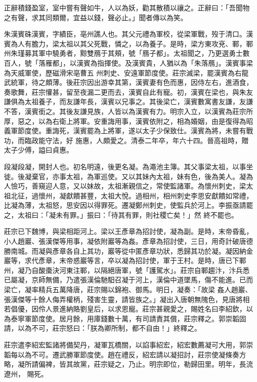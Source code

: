 \begin{pinyinscope}
 正辭積錢盈室，室中嘗有聲如牛，人以為妖，勸其散積以禳之。正辭曰：「吾聞物之有聲，求其同類爾，宜益以錢，聲必止。」聞者傳以為笑。



 朱漢賓硃漢賓，字績臣，亳州譙人也。其父元禮為軍校，從梁軍戰，歿于清口。漢賓為人有膽力，梁太祖以其父死戰，憐之，以為養子。是時，梁方東攻兗、鄆，鄆州朱瑾募其軍中驍勇者，黥雙鴈于其頰，號「鴈子都」。太祖聞之，乃更選勇士數百人，號「落雁都」，以漢賓為指揮使。及漢賓貴，人猶以為「朱落鴈」。漢賓事梁為天威軍使，歷磁滑宋亳曹五
 州刺史、安遠軍節度使。莊宗滅梁，罷漢賓為右龍武統軍，待之頗薄。後莊宗因出游幸其第，漢賓妻有色而惠，因侍左右，進酒食，奏歌舞，莊宗懽甚，留至夜漏二更而去，漢賓自此有寵。初，漢賓在梁也，與朱友謙俱為太祖養子，而友謙年長，漢賓以兄事之。其後梁亡，漢賓數寓書友謙，友謙不答，漢賓銜之。其後友謙見族，人皆以為漢賓有力。明宗入立，以漢賓為莊宗所厚，惡之，以為右衛上將軍。安重誨用事，漢賓依附之，相為婚姻，由是復得為昭義軍節度使。重誨死，漢賓罷為上將軍，遂以太子少保致仕。漢賓為將，未嘗有戰功，而臨政能守法，好
 施惠，人頗愛之。清泰二年卒，年六十四。晉高祖時，贈太子少傅，謚曰貞惠。



 段凝段凝，開封人也。初名明遠，後更名凝。為澠池主簿。其父事梁太祖，以事坐徙。後凝棄官，亦事太祖，為軍巡使。又以其妹內太祖，妹有色，後為美人。凝為人憸巧，善窺迎人意，又以妹故，太祖漸親信之，常使監諸軍。為懷州刺史，梁太祖北征，過懷州，凝獻饋甚豐，太祖大悅。過相州，相州刺史李思安獻饋如常禮，比凝為薄，太祖怒，思安因以得罪死。遷凝鄭州刺史，使監兵於河上。李振亟請罷之，太祖曰：「凝未有罪。」振曰：「待其有罪，則社稷亡矣！」然
 終不罷也。



 莊宗已下魏博，與梁相距河上。梁以王彥章為招討使，凝為副。是時，末帝昏亂，小人趙巖、張漢傑等用事，凝依附巖等為姦。彥章為招討使，三日，用奇計破唐德勝南城。而凝與彥章各自上其功，巖等從中匿彥章功狀，悉歸其功於凝。凝因納金巖等，求代彥章，末帝惑巖等言，卒以凝為招討使，軍于王村。是時，唐已下鄆州，凝乃自酸棗決河東注鄆，以隔絕唐軍，號「護駕水」。莊宗自鄆趨汴，汴兵悉已屬凝，京師無備，乃遣張漢倫馳馹召凝于河上，漢倫中道墜馬，傷不能進。已而梁亡，凝率精兵五萬降唐，莊宗賜以錦袍、御馬。明日，凝奏：「故梁
 姦人趙巖、張漢傑等十餘人侮弄權柄，殘害生靈，請皆族之。」凝出入唐朝無隗色，見唐將相若倡優，因伶人景進納賂劉皇后，以求恩寵。莊宗甚親愛之，賜姓名曰李紹欽，以為泰寧軍節度使。居月餘，用庫錢數十萬，有司請責其償，莊宗釋之。郭崇韜固請，以為不可，莊宗怒曰：「朕為卿所制，都不自由！」終釋之。



 莊宗遣李紹宏監諸將備契丹，凝軍瓦橋關，以諂事紹宏，紹宏數薦凝可大用，郭崇韜每以為不可。遷武勝軍節度使。趙在禮反，紹宏請以凝招討，莊宗使凝條奏方略，凝所請偏裨，皆其故黨，莊宗疑之，乃止。明宗即位，勒歸田里。明年，長流遼州，
 賜死。




\end{pinyinscope}
